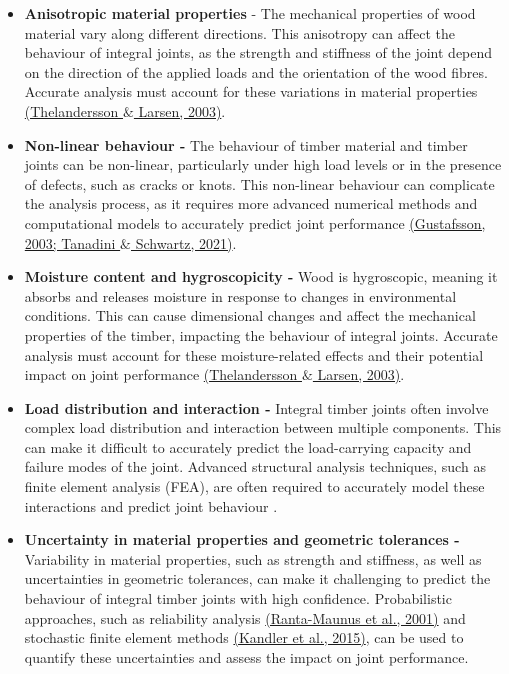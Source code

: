 \documentclass[11pt]{book}
\begin{document}
\begin{itemize}
	\item \textbf{Anisotropic material properties} - The mechanical properties of wood material vary along different directions. This anisotropy can affect the behaviour of integral joints, as the strength and stiffness of the joint depend on the direction of the applied loads and the orientation of the wood fibres. Accurate analysis must account for these variations in material properties \href{https://www.zotero.org/google-docs/?L0yiAX}{(Thelandersson $\&$ Larsen, 2003)}.

	\item \textbf{Non-linear behaviour - }The behaviour of timber material and timber joints can be non-linear, particularly under high load levels or in the presence of defects, such as cracks or knots. This non-linear behaviour can complicate the analysis process, as it requires more advanced numerical methods and computational models to accurately predict joint performance \href{https://www.zotero.org/google-docs/?BE40wh}{(Gustafsson, 2003; Tanadini $\&$ Schwartz, 2021)}.

	\item \textbf{Moisture content and hygroscopicity -} Wood is hygroscopic, meaning it absorbs and releases moisture in response to changes in environmental conditions. This can cause dimensional changes and affect the mechanical properties of the timber, impacting the behaviour of integral joints. Accurate analysis must account for these moisture-related effects and their potential impact on joint performance \href{https://www.zotero.org/google-docs/?6q9alE}{(Thelandersson $\&$ Larsen, 2003)}.

	\item \textbf{Load distribution and interaction -} Integral timber joints often involve complex load distribution and interaction between multiple components. This can make it difficult to accurately predict the load-carrying capacity and failure modes of the joint. Advanced structural analysis techniques, such as finite element analysis (FEA), are often required to accurately model these interactions and predict joint behaviour .

	\item \textbf{Uncertainty in material properties and geometric tolerances -} Variability in material properties, such as strength and stiffness, as well as uncertainties in geometric tolerances, can make it challenging to predict the behaviour of integral timber joints with high confidence. Probabilistic approaches, such as reliability analysis \href{https://www.zotero.org/google-docs/?Xd18TY}{(Ranta-Maunus et al., 2001)} and stochastic finite element methods \href{https://www.zotero.org/google-docs/?mnlFCb}{(Kandler et al., 2015)}, can be used to quantify these uncertainties and assess the impact on joint performance.

\end{itemize}
\end{document}
